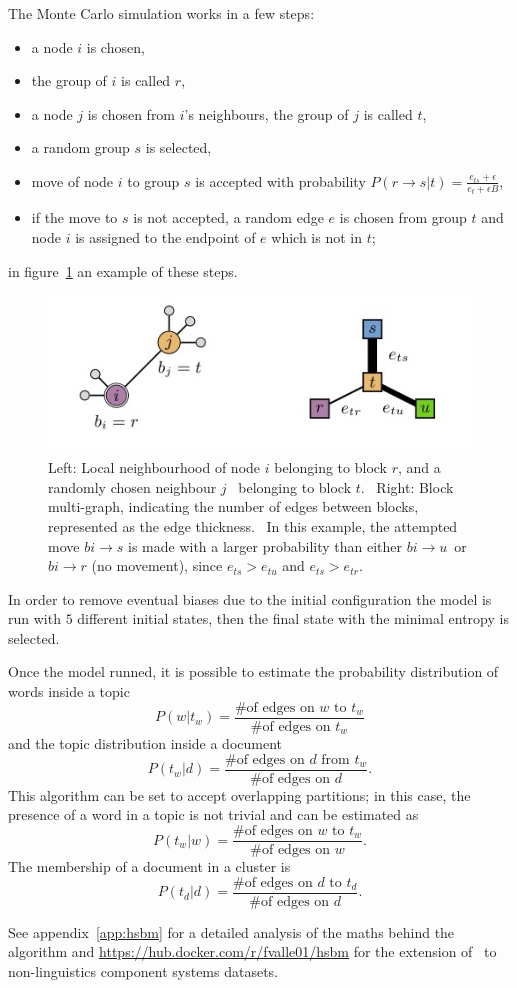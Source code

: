 The Monte Carlo simulation works in a few steps:
\begin{itemize}
 \item a node $i$ is chosen,
 \item the group of $i$ is called $r$,
  \item a node $j$ is chosen from $i$'s neighbours, the group of $j$ is called $t$,
  \item a random group $s$ is selected,
  \item move of node $i$ to group $s$ is accepted with probability $P(r\to s|t)=\frac{e_{ts}+\epsilon}{e_t+\epsilon B}$,
  \item if the move to $s$ is not accepted, a random edge $e$ is chosen from group $t$ and node $i$ is assigned to the endpoint of $e$ which is not in $t$;
\end{itemize}
in figure~\ref{fig:topic_peixioto_move} an example of these steps.
\begin{figure}[htb!]
  \centering
  \includegraphics[width=0.9\linewidth]{pictures/topic/peixioto_move.jpg}
  \caption{Left: Local neighbourhood of node $i$ belonging to block $r$, and a randomly chosen neighbour $j$ \
  belonging to block $t$. \
  Right: Block multi-graph, indicating the number of edges between blocks, represented as the edge thickness. \
  In this example, the attempted move $bi \to s$ is made with a larger probability than either $bi \to u$\
   or $bi \to r$ (no movement), since $e_{ts}>e_{tu}$ and $e_{ts}>e_{tr}$.}
  \label{fig:topic_peixioto_move}
\end{figure}

In order to remove eventual biases due to the initial configuration the model is run with $5$ different initial states, then the final state with the minimal entropy is selected.

Once the model runned, it is possible to estimate the probability distribution of words inside a topic
\[P(w|t_w)=\frac{\text{\# of edges on $w$ to $t_w$}}{\text{\# of edges on $t_w$}}\]
and the topic distribution inside a document
\[P(t_w|d)=\frac{\text{\# of edges on $d$ from $t_w$}}{\text{\# of edges on $d$}}.\]
This algorithm can be set to accept overlapping partitions; in this case, the presence of a word in a topic is not trivial and can be estimated as
\[P(t_w|w)=\frac{\text{\# of edges on $w$ to $t_w$}}{\text{\# of edges on $w$}}.\]
The membership of a document in a cluster is
\[P(t_d|d)=\frac{\text{\# of edges on $d$ to $t_d$}}{\text{\# of edges on $d$}}.\]

See appendix~\ref{app:hsbm} for a detailed analysis of the maths behind the algorithm and \url{https://hub.docker.com/r/fvalle01/hsbm} for the extension of~\cite{gerlach2018network} to non-linguistics component systems datasets.
